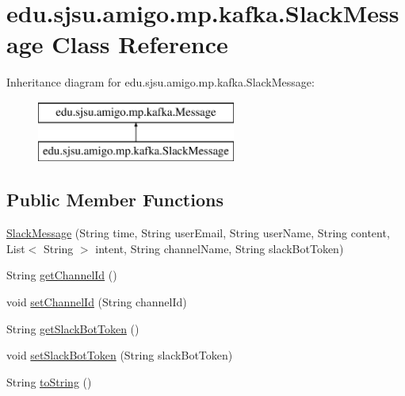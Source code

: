 \hypertarget{classedu_1_1sjsu_1_1amigo_1_1mp_1_1kafka_1_1_slack_message}{}\section{edu.\+sjsu.\+amigo.\+mp.\+kafka.\+Slack\+Message Class Reference}
\label{classedu_1_1sjsu_1_1amigo_1_1mp_1_1kafka_1_1_slack_message}
Inheritance diagram for edu.\+sjsu.\+amigo.\+mp.\+kafka.\+Slack\+Message\+:\begin{figure}[H]
\begin{center}
\leavevmode
\includegraphics[height=2.000000cm]{classedu_1_1sjsu_1_1amigo_1_1mp_1_1kafka_1_1_slack_message}
\end{center}
\end{figure}
\subsection*{Public Member Functions}
\begin{DoxyCompactItemize}
\item 
\hyperlink{classedu_1_1sjsu_1_1amigo_1_1mp_1_1kafka_1_1_slack_message_a706d258edc75e14aa115bfcc23a7e1eb}{Slack\+Message} (String time, String user\+Email, String user\+Name, String content, List$<$ String $>$ intent, String channel\+Name, String slack\+Bot\+Token)
\item 
String \hyperlink{classedu_1_1sjsu_1_1amigo_1_1mp_1_1kafka_1_1_slack_message_ad0f8198c748b38249b90d29398e494fe}{get\+Channel\+Id} ()
\item 
void \hyperlink{classedu_1_1sjsu_1_1amigo_1_1mp_1_1kafka_1_1_slack_message_a34371e0abcceff73267ae9c90a386e14}{set\+Channel\+Id} (String channel\+Id)
\item 
String \hyperlink{classedu_1_1sjsu_1_1amigo_1_1mp_1_1kafka_1_1_slack_message_a9fd84360668ae1810b8005bb63926e4c}{get\+Slack\+Bot\+Token} ()
\item 
void \hyperlink{classedu_1_1sjsu_1_1amigo_1_1mp_1_1kafka_1_1_slack_message_a612e1be2f19bb280ee03bea01e6a0d3f}{set\+Slack\+Bot\+Token} (String slack\+Bot\+Token)
\item 
String \hyperlink{classedu_1_1sjsu_1_1amigo_1_1mp_1_1kafka_1_1_slack_message_ab9ff1aa8ed0f03537e1e6020c5cebd29}{to\+String} ()
\end{DoxyCompactItemize}


